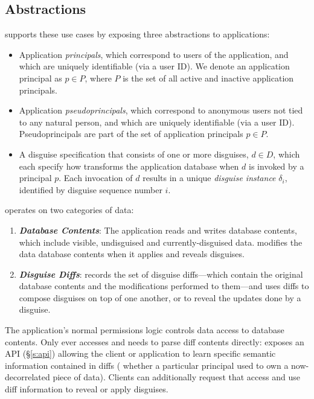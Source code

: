 \subsection{\sys Abstractions}
\sys supports these use cases by exposing three abstractions to applications:
\begin{itemize}
    \item Application \emph{principals}, which correspond to users of the application, 
	and which are uniquely identifiable (\eg via a user ID).
	We denote an application principal as $p \in P$, where $P$ is the set of all active and
        inactive application principals.
    \item Application \emph{pseudoprincipals}, which correspond to anonymous users not tied to any natural
    person, and which are uniquely identifiable (\eg via a user ID).
	Pseudoprincipals are part of the set of application principals $p \in P$.
    \item A disguise specification that consists of one or more disguises, $d \in D$, which each specify
	how \sys transforms the application database when $d$ is invoked by a principal $p$.
	Each invocation of $d$ results in a unique \emph{disguise instance} $\delta_i$, identified by
        disguise sequence number $i$.
\end{itemize}
%
%
\sys operates on two categories of data:
\begin{enumerate}
    \item \emph{\textbf{Database Contents}}: The application reads and writes database
        contents, which include visible, undisguised and currently-disguised data.
        \sys modifies the data database contents when it applies and reveals disguises.
    \item \emph{\textbf{Disguise Diffs}}: \sys records the set of disguise diffs---which contain the
        original database contents and the modifications performed to them---and uses diffs to
        compose disguises on top of one another, or to reveal the updates done by a disguise. 
\end{enumerate}

The application's normal permissions logic controls data access to database contents.  Only \sys
ever accesses and needs to parse diff contents directly: \sys exposes an API (\S\ref{s:api})
allowing the client or application to learn specific semantic information contained in diffs (\eg
whether a particular principal used to own a now-decorrelated piece of data). Clients can
additionally request that \sys access and use diff information to reveal or apply disguises.

